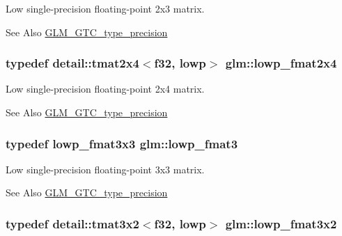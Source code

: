 Low single-\/precision floating-\/point 2x3 matrix. \begin{DoxySeeAlso}{See Also}
\hyperlink{group__gtc__type__precision}{G\-L\-M\-\_\-\-G\-T\-C\-\_\-type\-\_\-precision} 
\end{DoxySeeAlso}
\hypertarget{group__gtc__type__precision_ga14b4460b2132fd3db19b53ec6f9353f2}{
\subsubsection[{lowp\-\_\-fmat2x4}]{\setlength{\rightskip}{0pt plus 5cm}typedef detail\-::tmat2x4$<$f32, lowp$>$ {\bf glm\-::lowp\-\_\-fmat2x4}}}\label{group__gtc__type__precision_ga14b4460b2132fd3db19b53ec6f9353f2}
Low single-\/precision floating-\/point 2x4 matrix. \begin{DoxySeeAlso}{See Also}
\hyperlink{group__gtc__type__precision}{G\-L\-M\-\_\-\-G\-T\-C\-\_\-type\-\_\-precision} 
\end{DoxySeeAlso}
\hypertarget{group__gtc__type__precision_ga88ae00cab6aae48d56700915c7799973}{
\subsubsection[{lowp\-\_\-fmat3}]{\setlength{\rightskip}{0pt plus 5cm}typedef lowp\-\_\-fmat3x3 {\bf glm\-::lowp\-\_\-fmat3}}}\label{group__gtc__type__precision_ga88ae00cab6aae48d56700915c7799973}
Low single-\/precision floating-\/point 3x3 matrix. \begin{DoxySeeAlso}{See Also}
\hyperlink{group__gtc__type__precision}{G\-L\-M\-\_\-\-G\-T\-C\-\_\-type\-\_\-precision} 
\end{DoxySeeAlso}
\hypertarget{group__gtc__type__precision_ga6e03c9a11f7d781af7549ce566844cc6}{
\subsubsection[{lowp\-\_\-fmat3x2}]{\setlength{\rightskip}{0pt plus 5cm}typedef detail\-::tmat3x2$<$f32, lowp$>$ {\bf glm\-::lowp\-\_\-fmat3x2}}}\label{group__gtc__type__precision_ga6e03c9a11f7d781af7549ce566844cc6}
